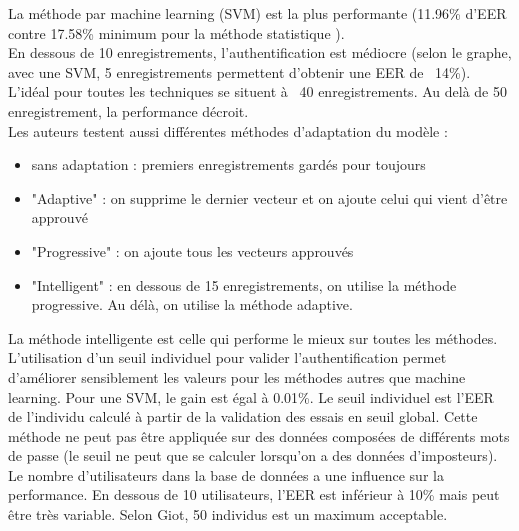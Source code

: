La méthode par machine learning (SVM) est la plus performante (11.96\% d'EER contre 17.58\% minimum pour la méthode statistique ).\\

En dessous de 10 enregistrements, l'authentification est médiocre (selon le graphe, avec une SVM, 5 enregistrements permettent d'obtenir une EER de ~14\%). L'idéal pour toutes les techniques se situent à ~40 enregistrements. Au delà de 50 enregistrement, la performance décroit.\\

Les auteurs testent aussi différentes méthodes d'adaptation du modèle :\\

\begin{itemize}
  \item sans adaptation : premiers enregistrements gardés pour toujours
  \item "Adaptive" : on supprime le dernier vecteur et on ajoute celui qui vient d'être approuvé
  \item "Progressive" : on ajoute tous les vecteurs approuvés
  \item "Intelligent" : en dessous de 15 enregistrements, on utilise la méthode progressive. Au délà, on utilise la méthode adaptive.
\end{itemize}

La méthode intelligente est celle qui performe le mieux sur toutes les méthodes.\\

L'utilisation d'un seuil individuel pour valider l'authentification permet d'améliorer sensiblement les valeurs pour les méthodes autres que machine learning. Pour une SVM, le gain est égal à 0.01\%. Le seuil individuel est l'EER de l'individu calculé à partir de la validation des essais en seuil global. Cette méthode ne peut pas être appliquée sur des données composées de différents mots de passe (le seuil ne peut que se calculer lorsqu'on a des données d'imposteurs).\\

Le nombre d'utilisateurs dans la base de données a une influence sur la performance. En dessous de 10 utilisateurs, l'EER est inférieur à 10\% mais peut être très variable. Selon Giot, 50 individus est un maximum acceptable.
